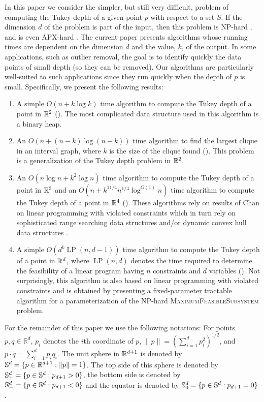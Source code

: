 \documentclass[12pt]{article}
\DeclareMathOperator{\lp}{LP}
\begin{document}
In this paper we consider the simpler, but still very difficult,
problem of computing the Tukey depth of a given point $p$ with respect
to a set $S$. If the dimension $d$ of the problem is part of the
input, then this problem is NP-hard \cite{jp78}, and is even APX-hard
\cite{ak95}.  The current paper presents algorithms whose running
times are dependent on the dimension $d$ and the value, $k$, of the
output.  In some applications, such as outlier removal, the goal is to
identify quickly the data points of small depth (so they can be
removed).  Our algorithms are particularly well-suited to such
applications since they run quickly when the depth of $p$ is small.
Specifically, we present the following results:

\begin{enumerate}
\item A simple $O(n + k\log k)$ time algorithm to compute the Tukey
depth of a point in $\mathbb{R}^2$
().  The most complicated data structure used in this
algorithm is a binary heap.

\item An $O(n + (n-k)\log(n-k))$ time algorithm to find the largest
clique in an interval graph, where $k$ is the size of the clique found
().  This problem is a generalization of the Tukey
depth problem in $\mathbb{R}^2$.

\item An $O(n\log n + k^2\log n)$ time algorithm to compute the Tukey
depth of a point in $\mathbb{R}^3$ and an $O(n + k^{11/4}n^{1/4}\log^{O(1)}n)$
time algorithm to compute the Tukey depth of a point in $\mathbb{R}^4$
().  These algorithms rely on results of Chan on linear
programming with violated constraints \cite{c05} which in turn rely on
sophisticated range searching data structures \cite{m92,r99} and/or
dynamic convex hull data structures \cite{bj02}.

\item A simple $O(d^k \lp(n,d-1))$ time algorithm to compute the Tukey
depth of a point in $\mathbb{R}^d$, where $\lp(n,d)$ denotes the time required
to determine the feasibility of a linear program having $n$
constraints and $d$ variables ().  Not surprisingly, this
algorithm is also based on linear programming with violated
constraints and is obtained by presenting a fixed-parameter tractable
algorithm for a parameterization of the NP-hard
\textsc{MaximumFeasibleSubsystem} problem.
\end{enumerate}

For the remainder of this paper we use the following notations: For
points $p,q\in\mathbb{R}^d$, $p_i$ denotes the $i$th coordinate of
$p$, $\|p\|=(\sum_{i=1}^d p_i^2)^{1/2}$, and $p\cdot
q=\sum_{i=1}^d p_iq_i$.  The unit sphere in $\mathbb{R}^{d+1}$ is denoted by
$\mathbb{S}^d =\{ p\in\mathbb{R}^{d+1} : \|p\|=1\}$. The top side of this sphere is
denoted by $\mathbb{S}^d_+ =\{ p\in\mathbb{S}^{d} : p_{d+1} > 0 \}$, the bottom
side is denoted by $\mathbb{S}^d_- =\{ p\in\mathbb{S}^{d} : p_{d+1} < 0 \}$ and the
equator is denoted by $\mathbb{S}^d_0 =\{ p\in\mathbb{S}^{d} : p_{d+1} = 0 \}$ .
\end{document}
